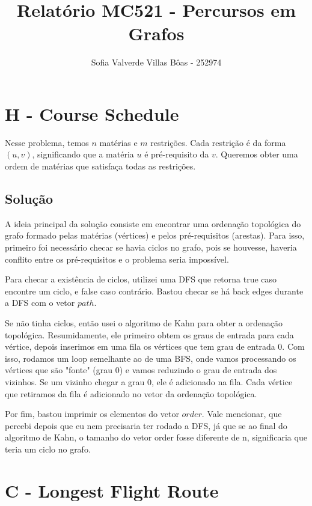\documentclass[12pt,a4paper]{article}
\title{Relatório MC521 - Percursos em Grafos}
\author{Sofia Valverde Villas Bôas - 252974}
\begin{document}
\maketitle

\section*{H - Course Schedule}

Nesse problema, temos $n$ matérias e $m$ restrições.
Cada restrição é da forma $(u, v)$, significando que a matéria $u$ é pré-requisito da $v$.
Queremos obter uma ordem de matérias que satisfaça todas as restrições.

\subsection*{Solução}

A ideia principal da solução consiste em encontrar uma ordenação topológica do grafo formado pelas matérias (vértices)
e pelos pré-requisitos (arestas). Para isso, primeiro foi necessário checar se havia ciclos no grafo, pois se houvesse, 
haveria conflito entre os pré-requisitos e o problema seria impossível.

Para checar a existência de ciclos, utilizei uma DFS que retorna true caso encontre um ciclo, e false caso contrário. 
Bastou checar se há back edges durante a DFS com o vetor $path$.

Se não tinha ciclos, então usei o algoritmo de Kahn para obter a ordenação topológica.
Resumidamente, ele primeiro obtem os graus de entrada para cada vértice, depois inserimos
em uma fila os vértices que tem grau de entrada 0. Com isso, rodamos um loop semelhante ao de uma
BFS, onde vamos processando os vértices que são "fonte" (grau 0) e vamos reduzindo o grau de entrada
dos vizinhos. Se um vizinho chegar a grau 0, ele é adicionado na fila. Cada vértice que retiramos da fila é 
adicionado no vetor da ordenação topológica.

Por fim, bastou imprimir os elementos do vetor $order$. Vale mencionar, que percebi depois que eu nem precisaria ter rodado a DFS,
já que se ao final do algoritmo de Kahn, o tamanho do vetor order fosse diferente de n, significaria que teria
um ciclo no grafo.

\section*{C - Longest Flight Route}
\end{document}
